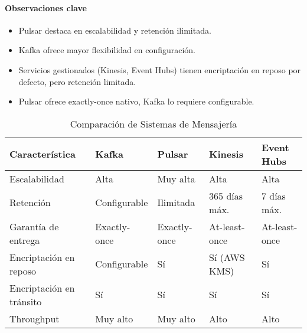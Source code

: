 \paragraph{Observaciones clave}
\begin{itemize}
    \item Pulsar destaca en escalabilidad y retención ilimitada.
    \item Kafka ofrece mayor flexibilidad en configuración.
    \item Servicios gestionados (Kinesis, Event Hubs) tienen encriptación en reposo por defecto, pero retención limitada.
    \item Pulsar ofrece exactly-once nativo, Kafka lo requiere configurable.
\end{itemize}
\clearpage
\begin{table}[h]
\footnotesize
\begin{tabular}{|p{3cm}|p{2cm}|p{2cm}|p{2cm}|p{2cm}|}
\hline
\textbf{Característica} & \textbf{Kafka} & \textbf{Pulsar} & \textbf{Kinesis} & \textbf{Event Hubs} \\
\hline
    Escalabilidad & Alta & Muy alta & Alta & Alta \\
\hline
Retención & Configurable & Ilimitada & 365 días máx. & 7 días máx. \\
\hline
Garantía de entrega & Exactly-once & Exactly-once & At-least-once & At-least-once \\
\hline
Encriptación en reposo & Configurable & Sí & Sí (AWS KMS) & Sí \\
\hline
Encriptación en tránsito & Sí & Sí & Sí & Sí \\
\hline
Throughput & {Muy alto} & {Muy alto} & {Alto} & {Alto} \\
\hline
\end{tabular}
\caption{Comparación de Sistemas de Mensajería}
\label{tab:comp_mensajeria}
\end{table}
\clearpage
\newpage
